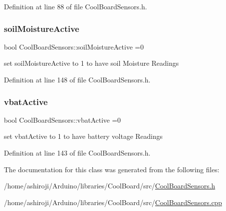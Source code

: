 Definition at line 88 of file Cool\+Board\+Sensors.\+h.

\mbox{\label{class_cool_board_sensors_ae7971bf527781ac4994309591b78ab89}} 
\subsubsection{\texorpdfstring{soil\+Moisture\+Active}{soilMoistureActive}}
{\footnotesize\ttfamily bool Cool\+Board\+Sensors\+::soil\+Moisture\+Active =0\hspace{0.3cm}{\ttfamily [private]}}

set soil\+Moisture\+Active to 1 to have soil Moisture Readings 

Definition at line 148 of file Cool\+Board\+Sensors.\+h.

\mbox{\label{class_cool_board_sensors_ab0b4bbae83796b52b90f91008d383583}} 
\subsubsection{\texorpdfstring{vbat\+Active}{vbatActive}}
{\footnotesize\ttfamily bool Cool\+Board\+Sensors\+::vbat\+Active =0\hspace{0.3cm}{\ttfamily [private]}}

set vbat\+Active to 1 to have battery voltage Readings 

Definition at line 143 of file Cool\+Board\+Sensors.\+h.



The documentation for this class was generated from the following files\+:\begin{DoxyCompactItemize}
\item 
/home/ashiroji/\+Arduino/libraries/\+Cool\+Board/src/\hyperlink{_cool_board_sensors_8h}{Cool\+Board\+Sensors.\+h}\item 
/home/ashiroji/\+Arduino/libraries/\+Cool\+Board/src/\hyperlink{_cool_board_sensors_8cpp}{Cool\+Board\+Sensors.\+cpp}\end{DoxyCompactItemize}
